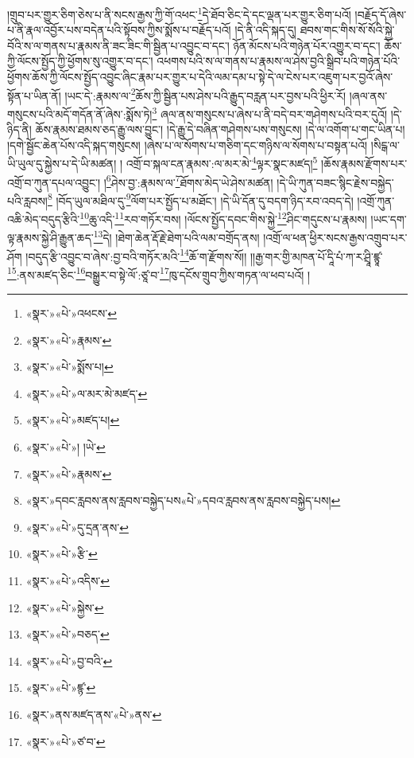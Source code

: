 །གྲུབ་པར་གྱུར་ཅིག་ཅེས་པ་ནི་སངས་རྒྱས་ཀྱི་གོ་འཕང་\footnote{«སྣར་»«པེ་»འཕངས་}དེ་ཐོབ་ཅིང་དེ་དང་ལྡན་པར་གྱུར་ཅིག་པའོ། །བརྗོད་དོ་ཞེས་པ་ནི་རྣལ་འབྱོར་པས་བདེན་པའི་སྟོབས་ཀྱིས་སྨོས་པ་བརྗོད་པའོ། །དེ་ནི་འདི་སྐད་དུ། ཐབས་གང་གིས་སོ་སོའི་སྐྱེ་བོའི་ས་ལ་གནས་པ་རྣམས་ནི་ཟང་ཟིང་གི་སྦྱིན་པ་འབྱུང་བ་དང་། ཉོན་མོངས་པའི་གཉེན་པོར་འགྱུར་བ་དང་། ཆོས་ཀྱི་ལོངས་སྤྱོད་ཀྱི་ཕྱོགས་སུ་འགྱུར་བ་དང་། འཕགས་པའི་ས་ལ་གནས་པ་རྣམས་ལ་ཤེས་བྱའི་སྒྲིབ་པའི་གཉེན་པོའི་ཕྱོགས་ཆོས་ཀྱི་ལོངས་སྤྱོད་འབྱུང་ཞིང་རྣམ་པར་གྱུར་པ་དེའི་ལམ་དམ་པ་སྟེ་དེ་ལ་ངེས་པར་འཇུག་པར་བྱའོ་ཞེས་སྟོན་པ་ཡིན་ནོ། །ཡང་དེ་:རྣམས་ལ་\footnote{«སྣར་»«པེ་»རྣམས་}ཆོས་ཀྱི་སྦྱིན་པས་ཤེས་པའི་རྒྱུད་བརླན་པར་བྱས་པའི་ཕྱིར་རོ། །ཞལ་ནས་གསུངས་པའི་མདོ་གདོན་ནོ་ཞེས་:སྨོས་ཏེ།\footnote{«སྣར་»«པེ་»སྨོས་པ།} ཞལ་ནས་གསུངས་པ་ཞེས་པ་ནི་བདེ་བར་གཤེགས་པའི་བར་དུའོ། །དེ་ཉིད་ནི། ཆོས་རྣམས་ཐམས་ཅད་རྒྱུ་ལས་བྱུང་། །དེ་རྒྱུ་དེ་བཞིན་གཤེགས་པས་གསུངས། །དེ་ལ་འགོག་པ་གང་ཡིན་པ། །དགེ་སྦྱོང་ཆེན་པོས་འདི་སྐད་གསུངས། །ཞེས་པ་ལ་སོགས་པ་གཅིག་དང་གཉིས་ལ་སོགས་པ་བསྟན་པའོ། །སིངྒ་ལ་ཡི་ཡུལ་དུ་སྐྱེས་པ་དེ་ཡི་མཚན། །
འགྲོ་བ་སྐལ་ངན་རྣམས་:ལ་མར་མེ་\footnote{«སྣར་»«པེ་»ལ་མར་མེ་མཛད་}ལྟར་སྣང་མཛད།\footnote{«སྣར་»«པེ་»མཛད་པ།} །ཆོས་རྣམས་རྫོགས་པར་འགྲོ་བ་ཀུན་དཔལ་འབྱུང་། །\footnote{«སྣར་»«པེ་»། །ཡེ་}ཤེས་བྱ་:རྣམས་ལ་\footnote{«སྣར་»«པེ་»རྣམས་}ཐོགས་མེད་ཡེ་ཤེས་མཚན། །དེ་ཡི་ཀུན་བཟང་སྙིང་རྗེས་བསྐྱེད་པའི་རླབས།\footnote{«སྣར་»དབང་རླབས་ནས་རླབས་བསྐྱེད་པས«པེ་»དབའ་རླབས་ནས་རླབས་བསྐྱེད་པས།} །བོད་ཡུལ་མཐིལ་དུ་\footnote{«སྣར་»«པེ་»དུ་དྲན་ནས་}ལོག་པར་སྤྱོད་པ་མཐོང་། །དེ་ཡི་དོན་དུ་བདག་ཉིད་རབ་འབད་དེ། །འགྲོ་ཀུན་འཆི་མེད་བདུད་རྩིའི་\footnote{«སྣར་»«པེ་»རྩི་}ཆུ་འདི་\footnote{«སྣར་»«པེ་»འདིས་}རབ་གཏོར་བས། །ལོངས་སྤྱོད་དབང་གིས་སྐྱེ་\footnote{«སྣར་»«པེ་»སྐྱེས་}ཤིང་གདུངས་པ་རྣམས། །ཡང་དག་ལྟ་རྣམས་སྐྱེ་ཤི་རྒྱུན་ཆད་\footnote{«སྣར་»«པེ་»བཅད་}དེ། །ཐེག་ཆེན་རྡོ་རྗེ་ཐེག་པའི་ལམ་བགྲོད་ནས། །འགྲོ་ལ་ཕན་ཕྱིར་སངས་རྒྱས་འགྲུབ་པར་ཤོག །བདུད་རྩི་འབྱུང་བ་ཞེས་:བྱ་བའི་གཏོར་མའི་\footnote{«སྣར་»«པེ་»བྱ་བའི་}ཆོ་ག་རྫོགས་སོ།། །།རྒྱ་གར་གྱི་མཁན་པོ་དཱི་པཾ་ཀ་ར་ཤྲཱི་ཛྙཱ་\footnote{«སྣར་»«པེ་»ཛྙ་}:ནས་མཛད་ཅིང་\footnote{«སྣར་»ནས་མཛད་ནས་«པེ་»ནས་}བསྒྱུར་བ་སྟེ་ལོ་:ཙཱ་བ་\footnote{«སྣར་»«པེ་»ཙ་བ་}ཁུ་དངོས་གྲུབ་ཀྱིས་གཏན་ལ་ཕབ་པའོ། །